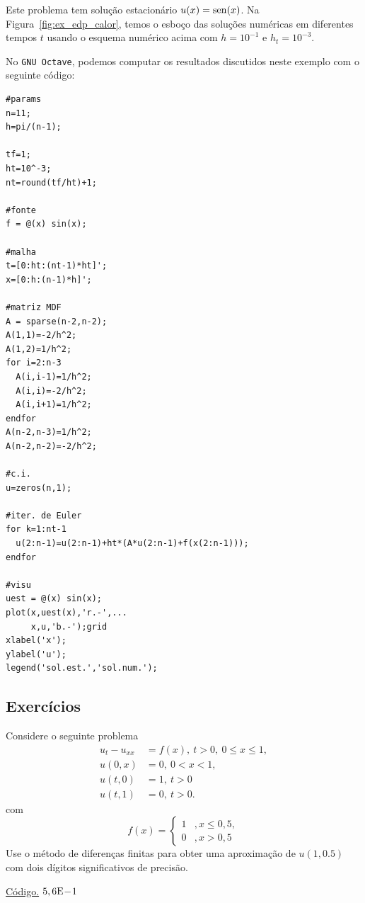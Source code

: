 \begin{ex}
Este problema tem solução estacionário $u(x) = \operatorname{sen}(x)$. Na Figura~\ref{fig:ex_edp_calor}, temos o esboço das soluções numéricas em diferentes tempos $t$ usando o esquema numérico acima com $h=10^{-1}$ e $h_t=10^{-3}$.

\ifisoctave
No \verb+GNU Octave+, podemos computar os resultados discutidos neste exemplo com o seguinte código:
\begin{verbatim}
#params
n=11;
h=pi/(n-1);

tf=1;
ht=10^-3;
nt=round(tf/ht)+1;

#fonte
f = @(x) sin(x);

#malha
t=[0:ht:(nt-1)*ht]'; 
x=[0:h:(n-1)*h]';

#matriz MDF
A = sparse(n-2,n-2);
A(1,1)=-2/h^2;
A(1,2)=1/h^2;
for i=2:n-3
  A(i,i-1)=1/h^2;
  A(i,i)=-2/h^2;
  A(i,i+1)=1/h^2;
endfor
A(n-2,n-3)=1/h^2;
A(n-2,n-2)=-2/h^2;

#c.i.
u=zeros(n,1);

#iter. de Euler
for k=1:nt-1
  u(2:n-1)=u(2:n-1)+ht*(A*u(2:n-1)+f(x(2:n-1)));
endfor

#visu
uest = @(x) sin(x);
plot(x,uest(x),'r.-',...
     x,u,'b.-');grid
xlabel('x');
ylabel('u');
legend('sol.est.','sol.num.');
\end{verbatim}
\fi
\end{ex}

\subsection*{Exercícios}

\begin{exer}
  Considere o seguinte problema
  \begin{align}
    u_t - u_{xx} &= f(x),~t>0,~0\leq x \leq 1,\\
    u(0,x) &= 0,~0<x<1,\\
    u(t,0) &= 1,~t>0\\
    u(t,1) &= 0,~t>0.
  \end{align}
com
\begin{equation}
  f(x) = \left\{
    \begin{array}{ll}
      1 &, x\leq 0,5,\\
      0 &, x>0,5
    \end{array}
\right.
\end{equation}
Use o método de diferenças finitas para obter uma aproximação de $u(1,0.5)$ com dois dígitos significativos de precisão.
\end{exer}
\begin{resp}
  \ifisoctave 
  \href{https://github.com/phkonzen/notas/blob/master/src/MatematicaNumerica/cap_edp/dados/exer_edp_calor_1/exer_edp_calor_1.m}{Código.} 
  \fi
  $5,6\mathrm{E}\!-\!1$
\end{resp}

